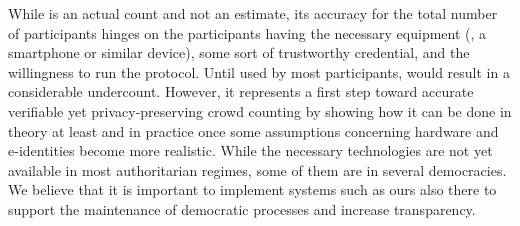 
While \CROCUS is an actual count and not an estimate, its accuracy for the total number of participants hinges on the participants having the necessary equipment (\ie, a smartphone or similar device), some sort of trustworthy credential, and the willingness to run the protocol. 
Until used by most participants, \CROCUS would result in a considerable undercount. 
However, it represents a first step toward accurate verifiable yet privacy-preserving crowd counting by showing how it can be done in theory at least and in practice once some assumptions concerning hardware and e-identities become more realistic. 
While the necessary technologies are not yet available in most authoritarian regimes, some of them are in several democracies. We believe that it is important to implement systems such as ours also there to support the maintenance of democratic processes and increase transparency.  


